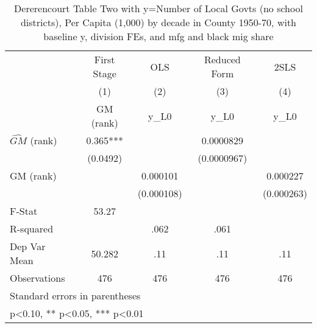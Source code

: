 \begin{table}[htbp]\centering
\def\sym#1{\ifmmode^{#1}\else\(^{#1}\)\fi}
\caption{Dererencourt Table Two with y=Number of Local Govts (no school districts), Per Capita (1,000) by decade in County 1950-70, with baseline y, division FEs, and mfg and black mig share}
\begin{tabular}{l*{4}{c}}
\toprule
                    & First Stage   &         OLS   &Reduced Form   &        2SLS   \\
                    &\multicolumn{1}{c}{(1)}&\multicolumn{1}{c}{(2)}&\multicolumn{1}{c}{(3)}&\multicolumn{1}{c}{(4)}\\
                    &\multicolumn{1}{c}{GM  (rank)}&\multicolumn{1}{c}{y\_L0}&\multicolumn{1}{c}{y\_L0}&\multicolumn{1}{c}{y\_L0}\\
\midrule
$\hat{GM}$ (rank)   &       0.365***&               &   0.0000829   &               \\
                    &    (0.0492)   &               & (0.0000967)   &               \\
\addlinespace
GM  (rank)          &               &    0.000101   &               &    0.000227   \\
                    &               &  (0.000108)   &               &  (0.000263)   \\
\midrule
F-Stat              &       53.27   &               &               &               \\
R-squared           &               &        .062   &        .061   &               \\
Dep Var Mean        &      50.282   &         .11   &         .11   &         .11   \\
Observations        &         476   &         476   &         476   &         476   \\
\bottomrule
\multicolumn{5}{l}{\footnotesize Standard errors in parentheses}\\
\multicolumn{5}{l}{\footnotesize * p<0.10, ** p<0.05, *** p<0.01}\\
\end{tabular}
\end{table}
